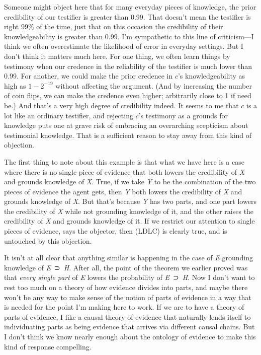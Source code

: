 \documentclass[
  10pt,
  letterpaper,
  DIV=11,
  numbers=noendperiod,
  twoside]{scrartcl}
\begin{document}
Someone might object here that for many everyday pieces of knowledge,
the prior credibility of our testifier is greater than 0.99. That
doesn't mean the testifier is right 99\% of the time, just that on this
occasion the credibility of their knowledgeability is greater than 0.99.
I'm sympathetic to this line of criticism---I think we often
overestimate the likelihood of error in everyday settings. But I don't
think it matters much here. For one thing, we often learn things by
testimony when our credence in the reliability of the testifier is much
lower than 0.99. For another, we could make the prior credence in
\(c\)'s knowledgeability as high as \(1 - 2^{-19}\) without affecting
the argument. (And by increasing the number of coin flips, we can make
the credence even higher; arbitrarily close to 1 if need be.) And that's
a very high degree of credibility indeed. It seems to me that \(c\) is a
lot like an ordinary testifier, and rejecting \(c\)'s testimony as a
grounds for knowledge puts one at grave risk of embracing an overarching
scepticism about testimonial knowledge. That is a sufficient reason to
stay away from this kind of objection.

The first thing to note about this example is that what we have here is
a case where there is no single piece of evidence that both lowers the
credibility of \emph{X} and grounds knowledge of \emph{X}. True, if we
take \emph{Y} to be the combination of the two pieces of evidence the
agent gets, then \emph{Y} both lowers the credibility of \emph{X} and
grounds knowledge of \emph{X}. But that's because \emph{Y} has two
parts, and one part lowers the credibility of \emph{X} while not
grounding knowledge of it, and the other raises the credibility of
\emph{X} and grounds knowledge of it. If we restrict our attention to
single pieces of evidence, says the objector, then (LDLC) is clearly
true, and is untouched by this objection.

It isn't at all clear that anything similar is happening in the case of
\emph{E} grounding knowledge of \emph{E}~⊃~\emph{H}. After all, the
point of the theorem we earlier proved was that \emph{every single part}
of \emph{E} lowers the probability of \emph{E}~⊃~\emph{H}. Now I don't
want to rest too much on a theory of how evidence divides into parts,
and maybe there won't be any way to make sense of the notion of parts of
evidence in a way that is needed for the point I'm making here to work.
If we are to have a theory of parts of evidence, I like a causal theory
of evidence that naturally lends itself to individuating parts as being
evidence that arrives via different causal chains. But I don't think we
know nearly enough about the ontology of evidence to make this kind of
response compelling.
\end{document}
